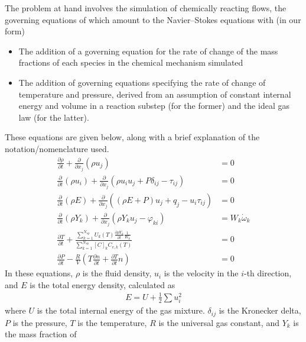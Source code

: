 The problem at hand involves the simulation of chemically reacting flows, the
governing equations of which amount to the Navier--Stokes equations with (in
our form)
\begin{itemize}
\item{The addition of a governing equation for the rate of change of the
      mass fractions of each species in the chemical mechanism simulated}
\item{The addition of governing equations specifying the rate of change of
      temperature and pressure, derived from an assumption of constant
      internal energy and volume in a reaction substep (for the former)
      and the ideal gas law (for the latter).}
\end{itemize}
These equations are given below, along with a brief explanation of the notation/nomenclature
used.
\pagebreak
\begin{align}
\frac{\partial \rho}{\partial t} + \frac{\partial}{\partial x_{j}}(\rho u_{j}) &= 0 \label{eq:consmass} \\
\frac{\partial}{\partial t}(\rho u_{i}) + \frac{\partial}{\partial x_{j}}(\rho u_{i} u_{j} + P\delta_{ij} - \tau_{ij}) &= 0 \label{eq:consmom} \\
\frac{\partial}{\partial t}(\rho E) + \frac{\partial}{\partial x_{j}}((\rho E + P)u_{j} + q_{j} - u_{i}\tau_{ij}) &= 0 \label{eq:conse} \\
\frac{\partial}{\partial t}(\rho Y_{k}) + \frac{\partial}{\partial x_{j}}(\rho Y_{k} u_{j} - \varphi_{ki}) &= W_{k}\dot{\omega}_{k} \label{eq:conssp}\\
\frac{\partial T}{\partial t} + \frac{\sum_{k=1}^{N_{sp}}U_{k}(T)\frac{\partial \rho Y_{k}}{\partial t}\frac{1}{W_{k}}}{\sum_{k=1}^{N_{sp}}[C]_{k}C_{v,k}(T)} &= 0 \label{eq:temp} \\
\frac{\partial P}{\partial t} - \frac{R}{V}(T\frac{\partial n}{\partial t} + \frac{\partial T}{\partial t}n) &= 0 \label{eq:pres}
\end{align}
In these equations, $\rho$ is the fluid density, $u_{i}$ is the velocity in the $i$-th direction, and $E$ is the total energy density,
calculated as
\begin{align}
E = U + \frac{1}{2} \sum u_{i}^{2}
\end{align}
where $U$ is the total internal energy of the gas mixture.
$\delta_{ij}$ is the Kronecker delta, $P$ is the pressure, $T$ is the temperature, $R$ is the universal gas constant, and $Y_{k}$ is the mass fraction of
